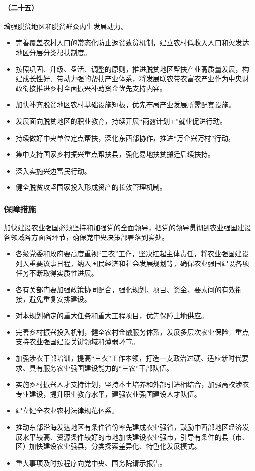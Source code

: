\paragraph{（二十五）}增强脱贫地区和脱贫群众内生发展动力。

\begin{itemize}
    \item 完善覆盖农村人口的常态化防止返贫致贫机制，建立农村低收入人口和欠发达地区分层分类帮扶制度。
    \item 按照巩固、升级、盘活、调整的原则，推进脱贫地区帮扶产业高质量发展，构建成长性好、带动力强的帮扶产业体系，将发展联农带农富农产业作为中央财政衔接推进乡村全面振兴补助资金优先支持内容。
    \item 加快补齐脱贫地区农村基础设施短板，优先布局产业发展所需配套设施。
    \item 发展面向脱贫地区的职业教育，持续开展“雨露计划+”就业促进行动。
    \item 持续做好中央单位定点帮扶，深化东西部协作，推进“万企兴万村”行动。
    \item 集中支持国家乡村振兴重点帮扶县，强化易地扶贫搬迁后续扶持。
    \item 深入实施兴边富民行动。
    \item 健全脱贫攻坚国家投入形成资产的长效管理机制。
\end{itemize}

\subsubsection{保障措施}

加快建设农业强国必须坚持和加强党的全面领导，把党的领导贯彻到农业强国建设各领域各方面各环节，确保党中央决策部署落到实处。

\begin{itemize}
    \item 各级党委和政府要高度重视“三农”工作，坚决扛起主体责任，将农业强国建设列入重要议事日程，纳入国民经济和社会发展规划等，确保农业强国建设各项任务不断取得实质性进展。
    \item 各有关部门要加强政策协同配合，强化规划、项目、资金、要素间的有效衔接，避免重复安排建设。
    \item 对本规划确定的重大任务和重大工程项目，优先保障土地供应。
    \item 完善乡村振兴投入机制，健全农村金融服务体系，发展多层次农业保险，重点支持农业强国建设关键领域和薄弱环节。
    \item 加强涉农干部培训，提高“三农”工作本领，打造一支政治过硬、适应新时代要求、具有服务农业强国建设能力的“三农”干部队伍。
    \item 实施乡村振兴人才支持计划，坚持本土培养和外部引进相结合，加强高校涉农专业建设，提升职业教育水平，建强农业强国建设人才队伍。
    \item 建立健全农业农村法律规范体系。
    \item 推动东部沿海发达地区有条件省份率先建成农业强省，鼓励中西部地区经济发展水平较高、资源条件较好的市地加快建设农业强市，引导有条件的县（市、区）加快建设农业强县，分类探索差异化、特色化发展模式。
    \item 重大事项及时按程序向党中央、国务院请示报告。
\end{itemize}

